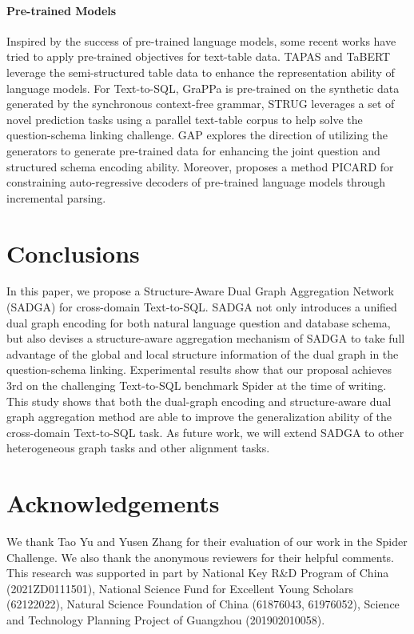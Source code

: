 \documentclass{article}
\begin{document}
\paragraph{Pre-trained Models}
Inspired by the success of pre-trained language models, some recent works have tried to apply pre-trained objectives for text-table data. TAPAS \citep{herzig2020tapas} and TaBERT \citep{yin2020tabert} leverage the semi-structured table data to enhance the representation ability of language models. For Text-to-SQL, GraPPa \citep{yu2021grappa} is pre-trained on the synthetic data generated by the synchronous context-free grammar, STRUG \citep{deng2021structure} leverages a set of novel prediction tasks using a parallel text-table corpus to help solve the question-schema linking challenge. GAP \citep{shi2021learning} explores the direction of utilizing the generators to generate pre-trained data for enhancing the joint question and structured schema encoding ability. Moreover, \citet{Scholak2021:PICARD} proposes a method PICARD for constraining auto-regressive decoders of pre-trained language models through incremental parsing.

\section{Conclusions}
In this paper, we propose a Structure-Aware Dual Graph Aggregation Network (SADGA) for cross-domain Text-to-SQL. SADGA not only introduces a unified dual graph encoding for both natural language question and database schema, but also devises a structure-aware aggregation mechanism of SADGA to take full advantage of the global and local structure information of the dual graph in the question-schema linking. Experimental results show that our proposal achieves 3rd on the challenging Text-to-SQL benchmark Spider at the time of writing. This study shows that both the dual-graph encoding and structure-aware dual graph aggregation method are able to improve the generalization ability of the cross-domain Text-to-SQL task. As future work, we will extend SADGA to other heterogeneous graph tasks and other alignment tasks.

\section*{Acknowledgements}
We thank Tao Yu and Yusen Zhang for their evaluation of our work in the Spider Challenge.
We also thank the anonymous reviewers for their helpful comments. This research was supported in part by  National Key R\&D Program of China (2021ZD0111501), National Science Fund for Excellent Young Scholars (62122022), Natural Science Foundation of China (61876043, 61976052), Science and Technology Planning Project of Guangzhou (201902010058).
\end{document}
